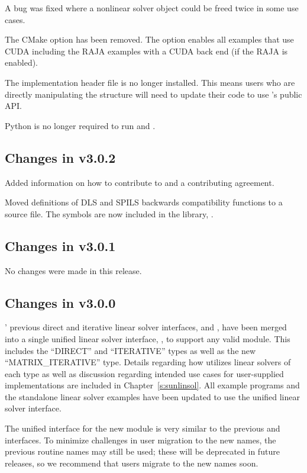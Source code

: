 A bug was fixed where a nonlinear solver object could be freed twice in some use
cases.

The  CMake option has been removed. The option 
enables all examples that use CUDA including the RAJA examples with a CUDA back end (if the RAJA
{\nvector} is enabled).

The implementation header file  is no longer installed. This means users
who are directly manipulating the  structure will need to update their code
to use {\idas}'s public API.

Python is no longer required to run  and .

\subsection*{Changes in v3.0.2}

Added information on how to contribute to {\sundials} and a contributing agreement.

Moved definitions of DLS and SPILS backwards compatibility functions to a source file.
The symbols are now included in the {\idas} library, .

\subsection*{Changes in v3.0.1}

No changes were made in this release.

\subsection*{Changes in v3.0.0}

{\idas}' previous direct and iterative linear solver interfaces,
{\idadls} and {\idaspils}, have been merged into a single unified linear
solver interface, {\idals}, to support any valid {\sunlinsol} module.
This includes the ``DIRECT'' and ``ITERATIVE'' types as well as the new
``MATRIX\_ITERATIVE'' type. Details regarding how {\idals} utilizes linear
solvers of each type as well as discussion regarding intended use cases for
user-supplied {\sunlinsol} implementations are included in
Chapter~\ref{s:sunlinsol}. All {\idas} example programs and the standalone
linear solver examples have been updated to use the unified linear solver
interface.

The unified interface for the new {\idals} module is very similar to the
previous {\idadls} and {\idaspils} interfaces. To minimize challenges in user
migration to the new names, the previous {\CC} routine names may still
be used; these will be deprecated in future releases, so we recommend that users
migrate to the new names soon.

